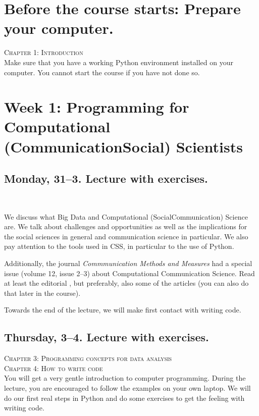 
\section*{Before the course starts: Prepare your computer.}

\textsc{ Chapter 1: Introduction}\\
Make sure that you have a working Python environment installed on your computer. You cannot start the course if you have not done so.

\section*{Week 1: Programming for Computational (Communication\textbar Social) Scientists}
\subsection*{Monday, 31--3. Lecture with exercises.}

\textsc{  \cite{Kitchin2014}} \\
\textsc{ \cite{Hilbert2019}}

We discuss what Big Data and Computational (Social\textbar Communication) Science are. We talk about challenges and opportunities as well as the implications for the social sciences in general and communication science in particular. We also pay attention to the tools used in CSS, in particular to the use of Python.

Additionally, the journal \textit{Commmunication Methods and Measures} had a special issue (volume 12, issue 2--3) about Computational Communication Science. Read at least the editorial \citep{VanAtteveldt2018a}, but preferably, also some of the articles (you can also do that later in the course).

Towards the end of the lecture, we will make first contact with writing code.

\subsection*{Thursday, 3--4. Lecture with exercises.}
\textsc{ Chapter 3: Programming concepts for data analysis}\\
\textsc{ Chapter 4: How to write code}\\

You will get a very gentle introduction to computer programming. During the lecture, you are encouraged to follow the examples on your own laptop.
We will do our first real steps in Python and do some exercises to get the feeling with writing code.

